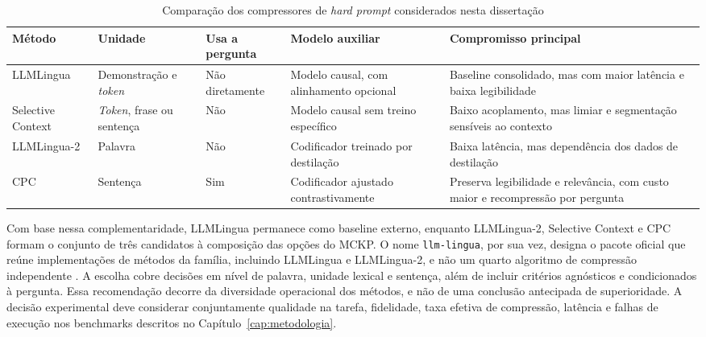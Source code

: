 \begin{table}[htbp]
\centering
\footnotesize
\caption{Comparação dos compressores de \textit{hard prompt} considerados nesta dissertação}
\label{tab:comparacao-compressores}
\begin{tabular}{>{\raggedright\arraybackslash}p{2.2cm}>{\raggedright\arraybackslash}p{2.2cm}>{\raggedright\arraybackslash}p{1.5cm}>{\raggedright\arraybackslash}p{2.9cm}>{\raggedright\arraybackslash}p{2.9cm}}
\toprule
\textbf{Método} & \textbf{Unidade} & \textbf{Usa a pergunta} & \textbf{Modelo auxiliar} & \textbf{Compromisso principal} \\
\midrule
LLMLingua \cite{jiang2023llmlingua} & Demonstração e \textit{token} & Não diretamente & Modelo causal, com alinhamento opcional & Baseline consolidado, mas com maior latência e baixa legibilidade \\
\addlinespace
Selective Context \cite{li2023selective} & \textit{Token}, frase ou sentença & Não & Modelo causal sem treino específico & Baixo acoplamento, mas limiar e segmentação sensíveis ao contexto \\
\addlinespace
LLMLingua-2 \cite{pan2024llmlingua2} & Palavra & Não & Codificador treinado por destilação & Baixa latência, mas dependência dos dados de destilação \\
\addlinespace
CPC \cite{li2024cpc} & Sentença & Sim & Codificador ajustado contrastivamente & Preserva legibilidade e relevância, com custo maior e recompressão por pergunta \\
\bottomrule
\end{tabular}
\end{table}

Com base nessa complementaridade, LLMLingua permanece como baseline externo, enquanto LLMLingua-2, Selective Context e CPC formam o conjunto de três candidatos à composição das opções do MCKP. O nome \texttt{llm-lingua}, por sua vez, designa o pacote oficial que reúne implementações de métodos da família, incluindo LLMLingua e LLMLingua-2, e não um quarto algoritmo de compressão independente \cite{microsoft2023llmlingua}. A escolha cobre decisões em nível de palavra, unidade lexical e sentença, além de incluir critérios agnósticos e condicionados à pergunta. Essa recomendação decorre da diversidade operacional dos métodos, e não de uma conclusão antecipada de superioridade. A decisão experimental deve considerar conjuntamente qualidade na tarefa, fidelidade, taxa efetiva de compressão, latência e falhas de execução nos benchmarks descritos no Capítulo~\ref{cap:metodologia}.

